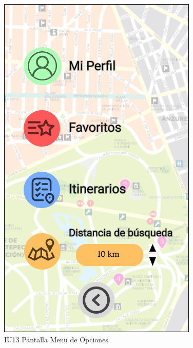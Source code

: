 \begin{figure}[h]
    \begin{minipage}{0.5\textwidth}
        \centering
        \includegraphics[width=.7\linewidth]{Pantallas Prototipo3/IU13 Pantalla Menu de Opciones.jpg}
        \caption{IU13 Pantalla Menu de Opciones}
    \end{minipage}
    

\end{figure}
